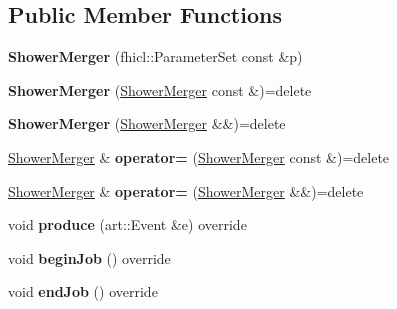 \subsection*{Public Member Functions}
\begin{DoxyCompactItemize}
\item 
{\bfseries Shower\+Merger} (fhicl\+::\+Parameter\+Set const \&p)\hypertarget{classShowerMerger_a50fc7d6db9b3f84bba1d7e7e68f1374e}{}\label{classShowerMerger_a50fc7d6db9b3f84bba1d7e7e68f1374e}

\item 
{\bfseries Shower\+Merger} (\hyperlink{classShowerMerger}{Shower\+Merger} const \&)=delete\hypertarget{classShowerMerger_a2b781d7856276bf348a49fd0a06cb24f}{}\label{classShowerMerger_a2b781d7856276bf348a49fd0a06cb24f}

\item 
{\bfseries Shower\+Merger} (\hyperlink{classShowerMerger}{Shower\+Merger} \&\&)=delete\hypertarget{classShowerMerger_a080dc5947c74294bf05cb5df45743571}{}\label{classShowerMerger_a080dc5947c74294bf05cb5df45743571}

\item 
\hyperlink{classShowerMerger}{Shower\+Merger} \& {\bfseries operator=} (\hyperlink{classShowerMerger}{Shower\+Merger} const \&)=delete\hypertarget{classShowerMerger_aa2a1c38ecced6bf3708cf075cc871b07}{}\label{classShowerMerger_aa2a1c38ecced6bf3708cf075cc871b07}

\item 
\hyperlink{classShowerMerger}{Shower\+Merger} \& {\bfseries operator=} (\hyperlink{classShowerMerger}{Shower\+Merger} \&\&)=delete\hypertarget{classShowerMerger_a93a9e5d5251f530287fdd39f77584bf2}{}\label{classShowerMerger_a93a9e5d5251f530287fdd39f77584bf2}

\item 
void {\bfseries produce} (art\+::\+Event \&e) override\hypertarget{classShowerMerger_ab7251dd56c36d4d8ba07437af0b33bb9}{}\label{classShowerMerger_ab7251dd56c36d4d8ba07437af0b33bb9}

\item 
void {\bfseries begin\+Job} () override\hypertarget{classShowerMerger_a042daf0f57e3c5c0c08dc9274f98b63e}{}\label{classShowerMerger_a042daf0f57e3c5c0c08dc9274f98b63e}

\item 
void {\bfseries end\+Job} () override\hypertarget{classShowerMerger_a37852496f6771e29b167cd09c6c65cd0}{}\label{classShowerMerger_a37852496f6771e29b167cd09c6c65cd0}

\end{DoxyCompactItemize}
